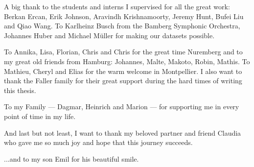 \bigskip

A big thank to the students and interns I supervised for all the great work: Berkan Ercan, Erik Johnson, Aravindh Krishnamoorty, Jeremy Hunt, Bufei Liu and Qiao Wang. 
To Karlheinz Busch from the Bamberg Symphonic Orchestra, Johannes Huber and Michael Müller for making our datasets possible. 

\bigskip


To Annika, Lisa, Florian, Chris and Chris for the great time Nuremberg and to my great old friends from Hamburg: Johannes, Malte, Makoto, Robin, Mathis. To Mathieu, Cheryl and Elias for the warm welcome in Montpellier.
I also want to thank the Faller family for their great support during the hard times of writing this thesis.

\bigskip

To my Family --- Dagmar, Heinrich and Marion --- for supporting me in every point of time in my life.

\bigskip

And last but not least, I want to thank my beloved partner and friend Claudia who gave me so much joy and hope that this journey succeeds.

\bigskip

...and to my son Emil for his beautiful smile.

\endgroup

